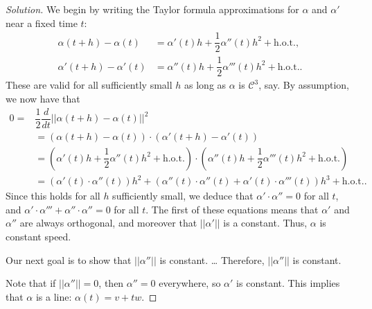 \documentclass[Shifrin_Solutions_Spring_2015]{subfiles}
\begin{document}
\begin{proof}[Solution] We begin by writing the Taylor formula approximations for $\alpha$ and $\alpha'$ near a fixed time $t$:
\begin{align*}
\alpha(t+h) - \alpha(t) & = \alpha'(t) h + \dfrac{1}{2}\alpha''(t) h^2 + \mbox{h.o.t.},  \\
\alpha'(t+h) - \alpha'(t) & = \alpha''(t) h + \dfrac{1}{2}\alpha'''(t) h^2 + \mbox{h.o.t.} .
\end{align*}
These are valid for all sufficiently small $h$ as long as $\alpha$ is $\mathcal{C}^3$, say.
By assumption, we now have that
\[
\begin{split}
0 = &  \dfrac{1}{2} \dfrac{d}{dt}\left|\left| \alpha(t+h) -\alpha(t) \right|\right|^2 \\
	& = \left( \alpha(t+h) - \alpha(t) \right) \cdot \left( \alpha'(t+h) - \alpha'(t) \right) \\
	& = \left( \alpha'(t) h + \dfrac{1}{2}\alpha''(t) h^2 + \mbox{h.o.t.} \right) \cdot \left( \alpha''(t) h + \dfrac{1}{2}\alpha'''(t) h^2 + \mbox{h.o.t.} \right) \\
	& = (\alpha'(t)\cdot \alpha''(t) ) h^2 + ( \alpha''(t)\cdot \alpha''(t) + \alpha'(t) \cdot \alpha'''(t) ) h^3 + \mbox{h.o.t.} .
\end{split}
\]
Since this holds for all $h$ sufficiently small, we deduce that $\alpha' \cdot \alpha'' = 0$ for all $t$, and $\alpha'\cdot \alpha''' +\alpha'' \cdot \alpha''=0$ for all $t$.
The first of these equations means that $\alpha'$ and $\alpha''$ are always orthogonal, and moreover that $||\alpha'||$ is a constant. Thus, $\alpha$ is constant speed.

Our next goal is to show that $||\alpha''||$ is constant.
\dots {}
Therefore, $||\alpha''||$ is constant.

Note that if $||\alpha''|| = 0$, then $\alpha''=0$ everywhere, so $\alpha'$ is constant. This implies that $\alpha$ is a line: $\alpha(t) = v+ t w$.


\end{proof}
\end{document}

